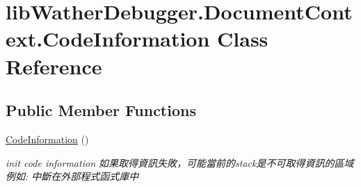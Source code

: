 \hypertarget{classlib_wather_debugger_1_1_document_context_1_1_code_information}{\section{lib\+Wather\+Debugger.\+Document\+Context.\+Code\+Information Class Reference}
\label{classlib_wather_debugger_1_1_document_context_1_1_code_information}
}
\subsection*{Public Member Functions}
\begin{DoxyCompactItemize}
\item 
\hyperlink{classlib_wather_debugger_1_1_document_context_1_1_code_information_a1793919ea494d2c9af1f99dcd5f3e324}{Code\+Information} ()
\begin{DoxyCompactList}\small\item\em init code information 如果取得資訊失敗，可能當前的stack是不可取得資訊的區域 例如\+: 中斷在外部程式函式庫中 \end{DoxyCompactList}\end{DoxyCompactItemize}
